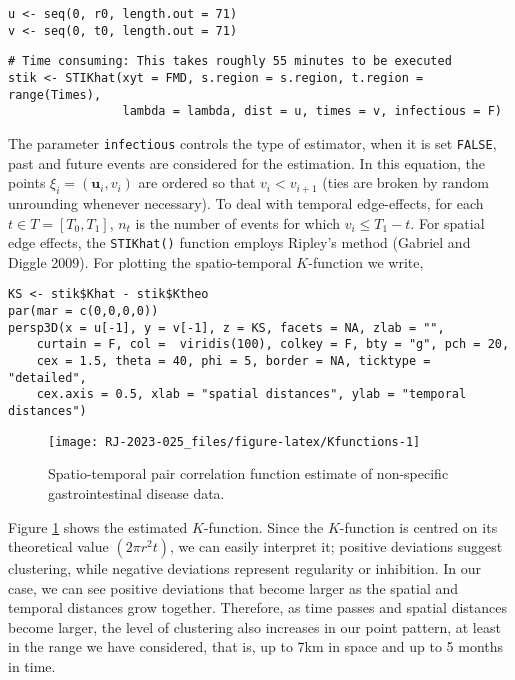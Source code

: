 \begin{verbatim}
u <- seq(0, r0, length.out = 71)
v <- seq(0, t0, length.out = 71)
\end{verbatim}

\begin{verbatim}
# Time consuming: This takes roughly 55 minutes to be executed
stik <- STIKhat(xyt = FMD, s.region = s.region, t.region = range(Times),
                lambda = lambda, dist = u, times = v, infectious = F)
\end{verbatim}

The parameter \texttt{infectious} controls the type of estimator, when it is set \texttt{FALSE}, past and future events are considered for the estimation. In this equation, the points \(\xi_i=(\mathbf{u}_i, v_i)\) are ordered so that \(v_i<v_{i+1}\) (ties are broken by random unrounding whenever necessary). To deal with temporal edge-effects, for each \(t\in T=[T_0,T_1]\), \(n_t\) is the number of events for which \(v_i\leq T_1 - t\). For spatial edge effects, the \texttt{STIKhat()} function employs Ripley's method (Gabriel and Diggle 2009). For plotting the spatio-temporal \(K\)-function we write,

\begin{verbatim}
KS <- stik$Khat - stik$Ktheo
par(mar = c(0,0,0,0))
persp3D(x = u[-1], y = v[-1], z = KS, facets = NA, zlab = "",
    curtain = F, col =  viridis(100), colkey = F, bty = "g", pch = 20, 
    cex = 1.5, theta = 40, phi = 5, border = NA, ticktype = "detailed", 
    cex.axis = 0.5, xlab = "spatial distances", ylab = "temporal distances")
\end{verbatim}

\begin{figure}

{\centering \texttt{[image: RJ-2023-025\_files/figure-latex/Kfunctions-1]} 

}

\caption{Spatio-temporal pair correlation function estimate of non-specific gastrointestinal disease data.}\label{fig:Kfunctions}
\end{figure}

Figure \ref{fig:Kfunctions} shows the estimated \(K\)-function. Since the \(K\)-function is centred on its theoretical value \((2\pi r^2 t)\), we can easily interpret it; positive deviations suggest clustering, while negative deviations represent regularity or inhibition. In our case, we can see positive deviations that become larger as the spatial and temporal distances grow together. Therefore, as time passes and spatial distances become larger, the level of clustering also increases in our point pattern, at least in the range we have considered, that is, up to 7km in space and up to 5 months in time.

